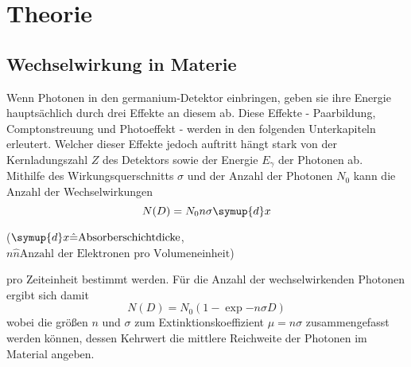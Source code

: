 \section{Theorie}
\subsection{Wechselwirkung in Materie}
Wenn Photonen in den germanium-Detektor einbringen, geben sie ihre Energie hauptsächlich durch drei Effekte an diesem ab. Diese Effekte - Paarbildung, Comptonstreuung und Photoeffekt - werden in den folgenden Unterkapiteln erleutert. Welcher dieser Effekte jedoch auftritt hängt stark von der Kernladungszahl $Z$ des Detektors sowie der Energie $E_\gamma$ der Photonen ab. \\
Mithilfe des Wirkungsquerschnitts $\sigma$ und der Anzahl der Photonen $N_0$ kann die Anzahl der Wechselwirkungen 
\begin{equation}
    N(D) = N_0 n \sigma \symup{d}x
\end{equation}
\begin{center}
    \tiny($ \symup{d}x \hat{=} \text{Absorberschichtdicke}$, $n \hat{n} \text{Anzahl der Elektronen pro Volumeneinheit}$)
\end{center}
pro Zeiteinheit bestimmt werden. 
Für die Anzahl der wechselwirkenden Photonen ergibt sich damit
\begin{equation}
    N(D) = N_0 \left( 1 - \exp{- n \sigma D } \right)
\end{equation}
wobei die größen $n$ und $\sigma$ zum Extinktionskoeffizient $\mu = n \sigma$ zusammengefasst werden können, dessen Kehrwert die mittlere Reichweite der Photonen im Material angeben. 

